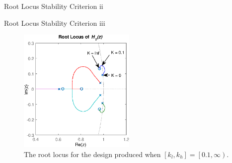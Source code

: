 \documentclass[10pt,usenames,dvipsnames]{beamer}
\begin{document}
{\begin{frame}{Root Locus Stability Criterion ii}
\end{frame}

\begin{frame}{Root Locus Stability Criterion iii}

\begin{figure}
	\centering
	\includegraphics[height=6cm]{rl-robust}
	\caption{The root locus for the design produced when $\left[k_l, k_h\right] = \left[0.1, \infty\right)$.}
\end{figure}

\end{frame}
}
\end{document}
